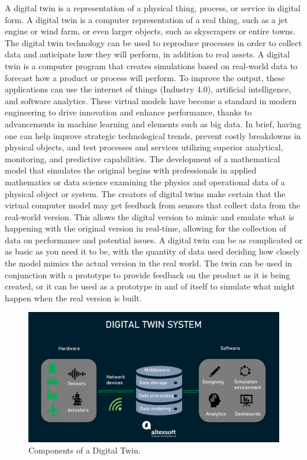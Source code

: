 A digital twin is a representation of a physical thing, process, or service in digital form. A digital twin is a computer representation of a real thing, such as a jet engine or wind farm, or even larger objects, such as skyscrapers or entire towns. The digital twin technology can be used to reproduce processes in order to collect data and anticipate how they will perform, in addition to real assets.
A digital twin is a computer program that creates simulations based on real-world data to forecast how a product or process will perform. To improve the output, these applications can use the internet of things (Industry 4.0), artificial intelligence, and software analytics. These virtual models have become a standard in modern engineering to drive innovation and enhance performance, thanks to advancements in machine learning and elements such as big data. In brief, having one can help improve strategic technological trends, prevent costly breakdowns in physical objects, and test processes and services utilizing superior analytical, monitoring, and predictive capabilities.
The development of a mathematical model that simulates the original begins with professionals in applied mathematics or data science examining the physics and operational data of a physical object or system. The creators of digital twins make certain that the virtual computer model may get feedback from sensors that collect data from the real-world version. This allows the digital version to mimic and emulate what is happening with the original version in real-time, allowing for the collection of data on performance and potential issues.
A digital twin can be as complicated or as basic as you need it to be, with the quantity of data used deciding how closely the model mimics the actual version in the real world.
The twin can be used in conjunction with a prototype to provide feedback on the product as it is being created, or it can be used as a prototype in and of itself to simulate what might happen when the real version is built.

\begin{figure}
    \includegraphics[width=\linewidth]{images/DigitalTwinSystem.png}
    \caption{Components of a Digital Twin.}
    \label{fig:digtaltwinsystem}
  \end{figure}
 
